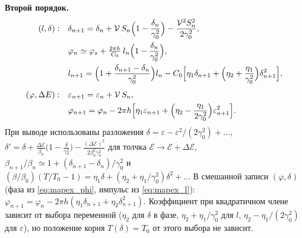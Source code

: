 \documentclass[a4paper,11pt]{article}
\numberwithin{equation}{section}
\newcommand{\cE}{\mathcal{E}}
\begin{document}
\medskip\noindent\textbf{Второй порядок.}
\begin{align}
(l,\delta):\quad &\delta_{n+1}=\delta_n+\mathcal V\,S_n\Big(1-\frac{\delta_n}{\gamma_0^2}\Big)-\frac{\mathcal V^2S_n^2}{2\gamma_0^2}, \notag\\
&\varphi_n\simeq\varphi_s+\tfrac{2\pi h}{C_0}\,l_n\Big(1-\frac{\delta_n}{\gamma_0^2}\Big), \notag\\
&l_{n+1}=\Big(1+\frac{\delta_{n+1}-\delta_n}{\gamma_0^2}\Big)l_n-C_0\Big[\eta_1\delta_{n+1}+\Big(\eta_2+\frac{\eta_1}{\gamma_0^2}\Big)\delta_{n+1}^2\Big],
\label{eq:map2}\\[4pt]
(\varphi,\Delta E):\quad &\varepsilon_{n+1}=\varepsilon_n+\mathcal V\,S_n, \notag\\
&\varphi_{n+1}=\varphi_n-2\pi h\Big[\eta_1\varepsilon_{n+1}+\Big(\eta_2-\frac{\eta_1}{2\gamma_0^2}\Big)\varepsilon_{n+1}^2\Big]. \label{eq:map2phi}
\end{align}
При выводе использованы разложения
$\delta=\varepsilon-\varepsilon^2/(2\gamma_0^2)+\dots$,
$\delta'=\delta+\tfrac{\Delta\cE}{\beta_0}\big(1-\tfrac{\delta}{\gamma_0^2}\big)-\tfrac{(\Delta\cE)^2}{2\beta_0^2\gamma_0^2}$ для толчка $\cE\to\cE+\Delta\cE$,
$\beta_{n+1}/\beta_n\simeq1+(\delta_{n+1}-\delta_n)/\gamma_0^2$ и
$(\beta/\beta_0)(T/T_0-1)=\eta_1\delta+(\eta_2+\eta_1/\gamma_0^2)\delta^2+\dots$
В смешанной записи $(\varphi,\delta)$ (фаза из \eqref{eq:mapex_phi}, импульс из \eqref{eq:mapex_l}):
$\varphi_{n+1}=\varphi_n-2\pi h(\eta_1\delta_{n+1}+\eta_2\delta_{n+1}^2)$. Коэффициент при квадратичном члене зависит от
выбора переменной ($\eta_2$ для $\delta$ в фазе, $\eta_2+\eta_1/\gamma_0^2$ для $l$, $\eta_2-\eta_1/(2\gamma_0^2)$ для
$\varepsilon$), но положение корня $T(\delta)=T_0$ от этого выбора не зависит.
\end{document}
